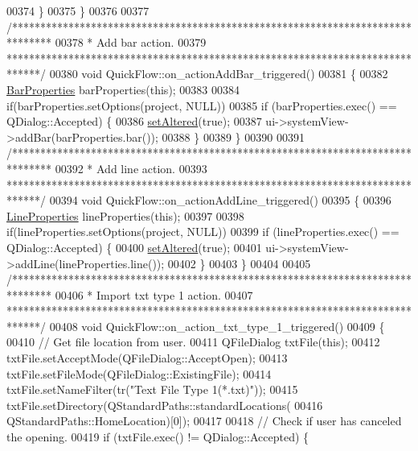 \begin{DoxyCode}
00374   \}
00375 \}
00376 
00377 \textcolor{comment}{/*******************************************************************************}
00378 \textcolor{comment}{ * Add bar action.}
00379 \textcolor{comment}{ ******************************************************************************/}
00380 \textcolor{keywordtype}{void} QuickFlow::on\_actionAddBar\_triggered()
00381 \{
00382   \hyperlink{class_bar_properties}{BarProperties} barProperties(\textcolor{keyword}{this});
00383 
00384   \textcolor{keywordflow}{if}(barProperties.setOptions(project, NULL))
00385     \textcolor{keywordflow}{if} (barProperties.exec() == QDialog::Accepted) \{
00386       \hyperlink{group___window_ga4b63ea5ca52a9eea14db0a22b5a133f8}{setAltered}(\textcolor{keyword}{true});
00387       ui->systemView->addBar(barProperties.bar());
00388     \}
00389 \}
00390 
00391 \textcolor{comment}{/*******************************************************************************}
00392 \textcolor{comment}{ * Add line action.}
00393 \textcolor{comment}{ ******************************************************************************/}
00394 \textcolor{keywordtype}{void} QuickFlow::on\_actionAddLine\_triggered()
00395 \{
00396   \hyperlink{class_line_properties}{LineProperties} lineProperties(\textcolor{keyword}{this});
00397 
00398   \textcolor{keywordflow}{if}(lineProperties.setOptions(project, NULL))
00399     \textcolor{keywordflow}{if} (lineProperties.exec() == QDialog::Accepted) \{
00400       \hyperlink{group___window_ga4b63ea5ca52a9eea14db0a22b5a133f8}{setAltered}(\textcolor{keyword}{true});
00401       ui->systemView->addLine(lineProperties.line());
00402     \}
00403 \}
00404 
00405 \textcolor{comment}{/*******************************************************************************}
00406 \textcolor{comment}{ * Import txt type 1 action.}
00407 \textcolor{comment}{ ******************************************************************************/}
00408 \textcolor{keywordtype}{void} QuickFlow::on\_action\_txt\_type\_1\_triggered()
00409 \{
00410   \textcolor{comment}{// Get file location from user.}
00411   QFileDialog txtFile(\textcolor{keyword}{this});
00412   txtFile.setAcceptMode(QFileDialog::AcceptOpen);
00413   txtFile.setFileMode(QFileDialog::ExistingFile);
00414   txtFile.setNameFilter(tr(\textcolor{stringliteral}{"Text File Type 1(*.txt)"}));
00415   txtFile.setDirectory(QStandardPaths::standardLocations(
00416                          QStandardPaths::HomeLocation)[0]);
00417 
00418   \textcolor{comment}{// Check if user has canceled the opening.}
00419   \textcolor{keywordflow}{if} (txtFile.exec() != QDialog::Accepted) \{

\end{DoxyCode}
